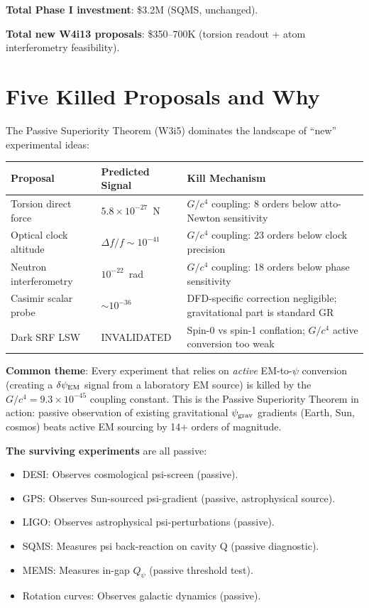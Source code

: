 \documentclass[11pt]{article}
\newcommand{\ee}[1]{\times 10^{#1}}
\newcommand{\dpsi}{\delta\psi}
\newcommand{\Qpsi}{Q_\psi}
\begin{document}
\textbf{Total Phase I investment}: \$3.2M (SQMS, unchanged).

\textbf{Total new W4i13 proposals}: \$350--700K (torsion readout + atom
interferometry feasibility).


\section{Five Killed Proposals and Why}

The Passive Superiority Theorem (W3i5) dominates the landscape of
``new'' experimental ideas:

\begin{center}
\renewcommand{\arraystretch}{1.3}
\begin{tabular}{@{}p{4cm}p{3cm}p{6cm}@{}}
\toprule
\textbf{Proposal} & \textbf{Predicted Signal} & \textbf{Kill Mechanism} \\
\midrule
Torsion direct force & $5.8\ee{-27}$~N & $G/c^4$ coupling: 8 orders
  below atto-Newton sensitivity \\
Optical clock altitude & $\Delta f/f \sim 10^{-41}$ & $G/c^4$ coupling:
  23 orders below clock precision \\
Neutron interferometry & $10^{-22}$~rad & $G/c^4$ coupling:
  18 orders below phase sensitivity \\
Casimir scalar probe & $\sim 10^{-36}$ & DFD-specific correction
  negligible; gravitational part is standard GR \\
Dark SRF LSW & INVALIDATED & Spin-0 vs spin-1 conflation;
  $G/c^4$ active conversion too weak \\
\bottomrule
\end{tabular}
\end{center}

\textbf{Common theme}: Every experiment that relies on \emph{active}
EM-to-$\psi$ conversion (creating a $\dpsi_{\rm EM}$ signal from a
laboratory EM source) is killed by the $G/c^4 = 9.3\ee{-45}$ coupling
constant. This is the Passive Superiority Theorem in action: passive
observation of existing gravitational $\psi_{\rm grav}$ gradients
(Earth, Sun, cosmos) beats active EM sourcing by 14+ orders of magnitude.

\textbf{The surviving experiments} are all passive:
\begin{itemize}[nosep]
\item DESI: Observes cosmological psi-screen (passive).
\item GPS: Observes Sun-sourced psi-gradient (passive, astrophysical source).
\item LIGO: Observes astrophysical psi-perturbations (passive).
\item SQMS: Measures psi back-reaction on cavity Q (passive diagnostic).
\item MEMS: Measures in-gap $\Qpsi$ (passive threshold test).
\item Rotation curves: Observes galactic dynamics (passive).
\end{itemize}
\end{document}

